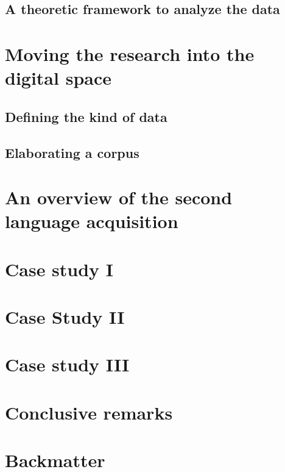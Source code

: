 \documentclass[a4paper,twoside,12pt,chapterprefix=false,bibliography=totocnumbered,listof=flat]{scrbook}
\begin{document}
\section{A theoretic framework to analyze the
data}\label{a-theoretic-framework-to-analyze-the-data}

\chapter{Moving the research into the digital
space}\label{moving-the-research-into-the-digital-space}

\section{Defining the kind of data}\label{defining-the-kind-of-data}

\section{Elaborating a corpus}\label{elaborating-a-corpus}

\chapter{An overview of the second language
acquisition}\label{an-overview-of-the-second-language-acquisition}

\chapter{Case study I}\label{case-study-i}

\chapter{Case Study II}\label{case-study-ii}

\chapter{Case study III}\label{case-study-iii}

\chapter{Conclusive remarks}\label{conclusive-remarks}

\backmatter

\chapter{Backmatter}\label{backmatter}
\end{document}
